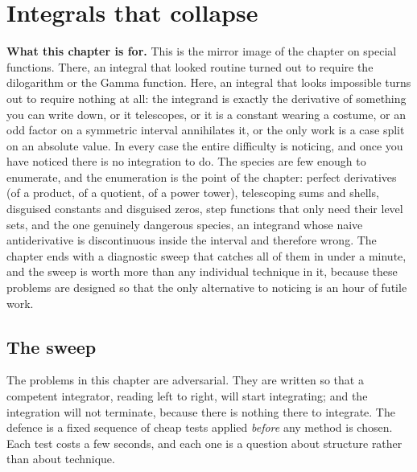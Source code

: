 \chapter{Integrals that collapse}

\begin{orient}
\textbf{What this chapter is for.} This is the mirror image of the chapter on special functions. There, an integral that looked routine turned out to require the dilogarithm or the Gamma function. Here, an integral that looks impossible turns out to require nothing at all: the integrand is exactly the derivative of something you can write down, or it telescopes, or it is a constant wearing a costume, or an odd factor on a symmetric interval annihilates it, or the only work is a case split on an absolute value. In every case the entire difficulty is noticing, and once you have noticed there is no integration to do. The species are few enough to enumerate, and the enumeration is the point of the chapter: perfect derivatives (of a product, of a quotient, of a power tower), telescoping sums and shells, disguised constants and disguised zeros, step functions that only need their level sets, and the one genuinely dangerous species, an integrand whose naive antiderivative is discontinuous inside the interval and therefore wrong. The chapter ends with a diagnostic sweep that catches all of them in under a minute, and the sweep is worth more than any individual technique in it, because these problems are designed so that the only alternative to noticing is an hour of futile work.
\end{orient}

\section{The sweep}

The problems in this chapter are adversarial. They are written so that a competent integrator, reading left to right, will start integrating; and the integration will not terminate, because there is nothing there to integrate. The defence is a fixed sequence of cheap tests applied \emph{before} any method is chosen. Each test costs a few seconds, and each one is a question about structure rather than about technique.

